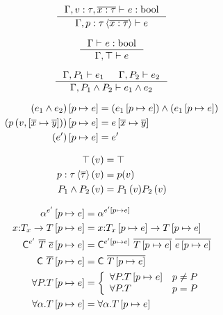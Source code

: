 \documentclass[10pt,a4paper]{article}
\begin{document}
$$
\inference{
	\hasType{\Gamma, v:\tau, \listOf{x:\tau}}{}{e}{\tbool}
}{
	\isWellFormedP{\Gamma}{\pdVar{p}{\tau}{\listOf{x:\tau}}}{e}
}[]
$$

$$
\inference{
	\hasType{\Gamma}{}{e}{\tbool}
}{
	\isWellFormedP{\Gamma}{\pdTrue}{e}
}[]
$$

$$
\inference{
	\isWellFormedP{\Gamma}{P_1}{e_1} &
	\isWellFormedP{\Gamma}{P_2}{e_2}
}{
	\isWellFormedP{\Gamma}{\pdAnd{P_1}{P_2}}{e_1 \land e_2}
}[]
$$

\hfill{}

\begin{align*}
(e_1 \land e_2)  \left[ p \mapsto e \right]  &= (e_1  \left[ p \mapsto e \right] ) \land (e_1  \left[ p \mapsto e \right] )\\
( p \left( v,  \left[ \overline{x} \mapsto \overline{y} \right]  \right) )  \left[ p \mapsto e \right]  &= e \left[ \overline{x} \mapsto \overline{y} \right]  \\
(e')  \left[ p \mapsto e \right]  &= e'
\end{align*}

\hfill{}

\begin{align*}
 \top \left( v \right)  &= \top \\
 p : \tau \left\langle \overline{\tau} \right\rangle  \left( v \right)  &= p(v) \\
 P_1 \land P_2 \left( v \right)  &= { P_1 \left( v \right) }{ P_2 \left( v \right) }
\end{align*}

\hfill{}

\begin{align*}
\alpha ^{e'} \left[ p \mapsto e \right]  &= \alpha ^{e' \left[ p \mapsto e \right] }\\
{x}\text{:}{\ensuremath{T}_x} \rightarrow {\ensuremath{T}} \left[ p \mapsto e \right]  &= {x}\text{:}{\ensuremath{T}_x\ensuremath{ \left[ p \mapsto e \right] }} \rightarrow {\ensuremath{T}\ensuremath{ \left[ p \mapsto e \right] }}\\
\mathsf{\mathsf{C}} ^{e'} \ \overline{T} \ \overline{e} \left[ p \mapsto e \right]  
	&= \mathsf{\mathsf{C}} ^{e' \left[ p \mapsto e \right] } \ \overline{T \left[ p \mapsto e \right] } \ \overline{e \left[ p \mapsto e \right] } \\
\mathsf{\mathsf{C}} \ \overline{T} \left[ p \mapsto e \right]  
	&= \mathsf{\mathsf{C}} \ \overline{T \left[ p \mapsto e \right] }\\
\forall P . T \left[ p \mapsto e \right]  &=
	\left\{
		\begin{array}{ll}
		\forall P . T \left[ p \mapsto e \right] 	& p \neq P \\
		\forall P . T				& p = P 
		\end{array}
	\right. \\
\forall \alpha . T \left[ p \mapsto e \right]  &=
		\forall \alpha . T \left[ p \mapsto e \right] \\
\end{align*}
\end{document}
